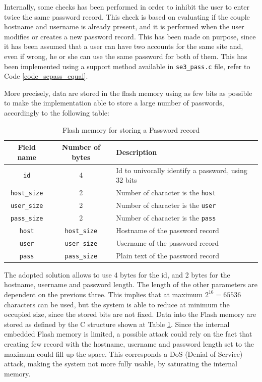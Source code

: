 Internally, some checks has been performed in order to inhibit the user to enter twice the same password record. This check is based on evaluating if the couple hostname and username is already present, and it is performed when the user modifies or creates a new password record. This has been made on purpose, since it has been assumed that a user can have two accounts for the same site and, even if wrong, he or she can use the same password for both of them. This has been implemented using a support method available in \texttt{se3\_pass.c} file, refer to Code \ref{code_sepass_equal}.

More precisely, data are stored in the flash memory using as few bits as possible to make the implementation able to store a large number of passwords, accordingly to the following table:
\begin{table}[H]
	\begin{tabular}{ c c l }
		\textbf{Field name} & \textbf{Number of bytes} & \textbf{Description}\\ 
		\hline
		\texttt{id} & 4 & Id to univocally identify a password, using 32 bits\\ 
		\hline
		\texttt{host\_size} & 2 & Number of character is the \texttt{host} \\  
		\hline
		\texttt{user\_size} & 2 &  Number of character is the \texttt{user} \\  
		\hline
		\texttt{pass\_size} & 2 &  Number of character is the \texttt{pass} \\  
		\hline
		\texttt{host} & \texttt{host\_size} & Hostname of the password record \\  
		\hline
		\texttt{user} & \texttt{user\_size} & Username of the password record\\  
		\hline
		\texttt{pass} & \texttt{pass\_size} & Plain text of the password record\\  
		\hline
	\end{tabular}
\caption{Flash memory for storing a Password record}
\label{tab:flashmem_pass}
\end{table}

The adopted solution allows to use 4 bytes for the id, and 2 bytes for the hostname, username and password length. The length of the other parameters are dependent on the previous three. This implies that at maximum $2^{16} = 65536$ characters can be used, but the system is able to reduce at minimum the occupied size, since the stored bits are not fixed.\newline\newline
Data into the Flash memory are stored as defined by the C structure shown at Table \ref{tab:flashmem_pass}. Since the internal embedded Flash memory is limited, a possible attack could rely on the fact that creating few record with the hostname, username and password length set to the maximum could fill up the space. This corresponds a DoS (Denial of Service) attack, making the system not more fully usable, by saturating the internal memory.

